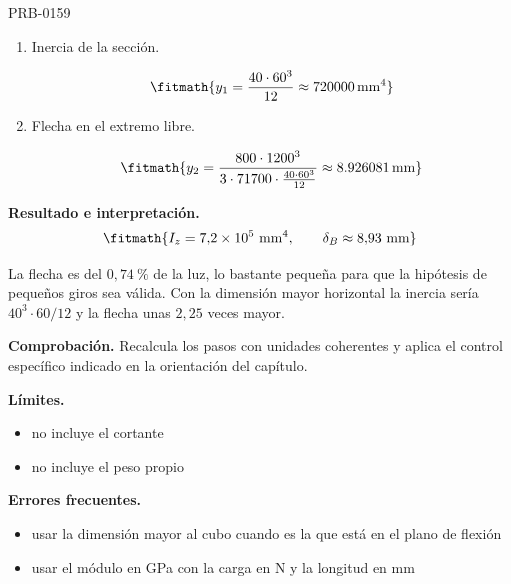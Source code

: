 \begin{studiumworked}{PRB-0159}
\begin{enumerate}

\item Inercia de la sección.

\[\fitmath{y_{1}=\frac{40\cdot {60}^{3}}{12}\approx 720000\,\mathrm{mm^{4}}}\]

\item Flecha en el extremo libre.

\[\fitmath{y_{2}=\frac{800\cdot {1200}^{3}}{3\cdot 71700\cdot \frac{40\cdot {60}^{3}}{12}}\approx 8.926081\,\mathrm{mm}}\]

\end{enumerate}

\textbf{Resultado e interpretación.}\[\fitmath{I_z = 7{,}2\times 10^{5}\ \mathrm{mm}^{4},\qquad \delta_B \approx 8{,}93\ \mathrm{mm}}\]

La flecha es del $0{,}74\ \%$ de la luz, lo bastante pequeña para que la hipótesis de pequeños giros sea válida. Con la dimensión mayor horizontal la inercia sería $40^3\cdot 60/12$ y la flecha unas $2{,}25$ veces mayor.

\par\textbf{Comprobación.} Recalcula los pasos con unidades coherentes y aplica el control específico indicado en la orientación del capítulo.

\textbf{Límites.}\begin{itemize}\item no incluye el cortante
\item no incluye el peso propio\end{itemize}

\textbf{Errores frecuentes.}\begin{itemize}\item usar la dimensión mayor al cubo cuando es la que está en el plano de flexión
\item usar el módulo en GPa con la carga en N y la longitud en mm\end{itemize}

\end{studiumworked}

\Needspace{.3\textheight}

